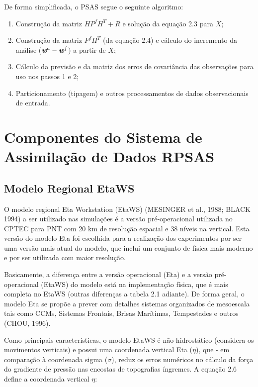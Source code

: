 De forma simplificada, o PSAS segue o seguinte algoritmo:

\begin{enumerate}
\item Construção da matriz $HP^{f}H^{T}+R$ e solução da equação 2.3 para $X$;
\item Construção da matriz $P^{f}H^{T}$ (da equação 2.4) e cálculo do incremento da análise ($\textit{\textbf{w}}^a-\textit{\textbf{w}}^f$) a partir de $X$;
\item Cálculo da previsão e da matriz dos erros de covariância das observações para uso nos passos 1 e 2;
\item Particionamento (tipagem) e outros processamentos de dados observacionais de entrada.
\end{enumerate}

\section{Componentes do Sistema de Assimilação de Dados RPSAS}
\label{ss:compsisassimdados}

\subsection{Modelo Regional EtaWS}

O modelo regional Eta Workstation (EtaWS) (MESINGER et al., 1988; BLACK 1994) a ser utilizado nas simulações é a versão pré-operacional utilizada no CPTEC para PNT com 20 km de resolução espacial e 38 níveis na vertical. Esta versão do modelo Eta foi escolhida para a realização dos experimentos por ser uma versão mais atual do modelo, que inclui um conjunto de física mais moderno e por ser utilizada com maior resolução. 

Basicamente, a diferença entre a versão operacional (Eta) e a versão pré-operacional (EtaWS) do modelo está na implementação física, que é mais completa no EtaWS (outras diferenças a tabela 2.1 adiante). De forma geral, o modelo Eta se propõe a prever com detalhes sistemas organizados de mesoescala tais como CCMs, Sistemas Frontais, Brisas Marítimas, Tempestades e outros (CHOU, 1996).

Como principais características, o modelo EtaWS é não-hidrostático (considera os movimentos verticais) e possui uma coordenada vertical Eta ($\eta$), que - em comparação à coordenada sigma ($\sigma$), reduz os erros numéricos no cálculo da força do gradiente de pressão nas encostas de topografias íngremes. A equação 2.6 define a coordenada vertical $\eta$:

